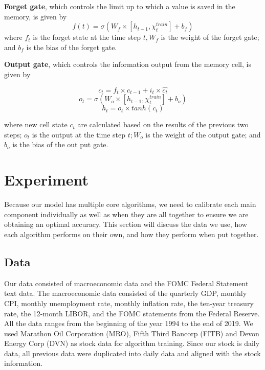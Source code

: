 \documentclass{article}
\begin{document}
\textbf{Forget gate}, which controls the limit up to which a value is saved in the memory, is given by
$$f(t) = \sigma (W_{f} \times [h_{t-1}, \chi_{t}^{train}]+b_{f})$$
where $f_{t}$ is the forget state at the time step $t, W_{f}$ is the weight of the forget gate; and $b_{f}$ is the bias of the forget gate.

\textbf{Output gate}, which controls the information output from the memory cell, is given by

$$ c_{t} = f_{t} \times c_{t-1} + i_{t} \times \hat{c_{t}}$$
$$o_{t} = \sigma (W_{o} \times [h_{t-1}, \chi_{t}^{train}] + b_{o})$$
$$h_{t} = o_{t} \times tanh(c_{t})$$

where new cell state $c_{t}$ are calculated based on the results of the previous two steps; $o_{t}$ is the output at the time step $t; W_{o}$ is the weight of the output gate; and $b_{o}$ is the bias of the out put gate. \\

\section{Experiment}
Because our model has multiple core algorithms, we need to calibrate each main component individually as well as when they are all together to ensure we are obtaining an optimal accuracy. This section will discuss the data we use, how each algorithm performs on their own, and how they perform when put together.
\subsection{Data}
Our data consisted of macroeconomic data and the FOMC Federal Statement text data. The macroeconomic data consisted of the quarterly GDP, monthly CPI, monthly unemployment rate, monthly inflation rate, the ten-year treasury rate, the 12-month LIBOR, and the FOMC statements from the Federal Reserve. All the data ranges from the beginning of the year 1994 to the end of 2019. We used Marathon Oil Corporation (MRO), Fifth Third Bancorp (FITB) and Devon Energy Corp (DVN) as stock data for algorithm training. Since our stock is daily data, all previous data were duplicated into daily data and aligned with the stock information. 
\end{document}
